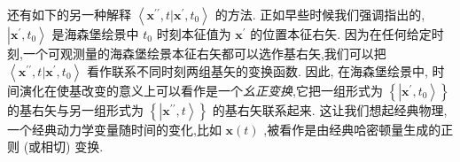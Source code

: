 \documentclass[lang=cn,newtx,10pt,scheme=chinese,thmcnt=section]{elegantbook}
\begin{document}
还有如下的另一种解释 $\left\langle {{\mathbf{x}}^{\prime \prime }, t | {\mathbf{x}}^{\prime },{t}_{0}}\right\rangle$ 的方法. 正如早些时候我们强调指出的, $\left| {{\mathbf{x}}^{\prime },{t}_{0}}\right\rangle$ 是海森堡绘景中 ${t}_{0}$ 时刻本征值为 ${\mathbf{x}}^{\prime }$ 的位置本征右矢. 因为在任何给定时刻,一个可观测量的海森堡绘景本征右矢都可以选作基右矢,我们可以把 $\left\langle {{\mathbf{x}}^{\prime \prime }, t | {\mathbf{x}}^{\prime },{t}_{0}}\right\rangle$ 看作联系不同时刻两组基矢的变换函数. 因此, 在海森堡绘景中, 时间演化在使基改变的意义上可以看作是一个\textit{幺正变换},它把一组形式为 $\left\{ \left| {{\mathbf{x}}^{\prime },{t}_{0}}\right\rangle \right\}$ 的基右矢与另一组形式为 $\left\{ \left| {{\mathbf{x}}^{\prime \prime }, t}\right\rangle \right\}$ 的基右矢联系起来. 这让我们想起经典物理,一个经典动力学变量随时间的变化,比如 $\mathbf{x}\left( t\right)$ ,被看作是由经典哈密顿量生成的正则 (或相切) 变换.
\end{document}
